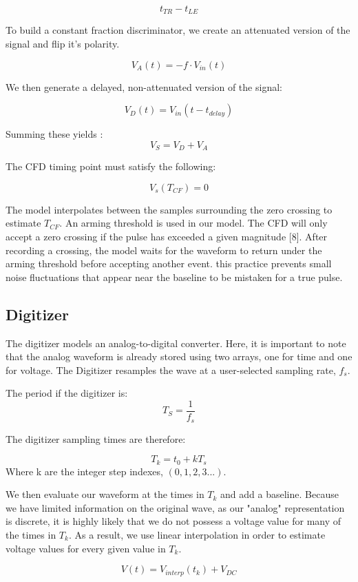 \documentclass[10pt]{article}
\begin{document}
$$
t_{TR}-t_{LE}
$$


To build a constant fraction discriminator, we create an attenuated version of the signal and flip it's polarity. 

$$
V_A(t) = - f \cdot V_{in}(t)
$$

We then generate a delayed, non-attenuated version of the signal: 

$$
V_D(t) = V_{in}(t -t_{delay})
$$

Summing these yields : 
$$
V_{S} = V_D  +V_A
$$

The CFD timing point must satisfy the following: 

$$
V_s(T_{CF}) = 0
$$

The model interpolates between the samples surrounding the zero crossing to estimate $T_{CF}$. An arming threshold is used in our model. The CFD will only accept a zero crossing if the pulse has exceeded a given magnitude [8]. After recording a crossing, the model waits for the waveform to return under the arming threshold before accepting another event. this practice prevents small noise fluctuations that appear near the baseline to be mistaken for a true pulse. 



\subsection{Digitizer}
The digitizer models an analog-to-digital converter. Here, it is important to note that the analog waveform is already stored using two arrays, one for time and one for voltage. The Digitizer resamples the wave at a user-selected sampling rate, $f_s$. 

The period if the digitizer is:
$$
T_S = \frac{1}{f_s}
$$

The digitizer sampling times are therefore: 

$$
T_k = t_0 + kT_s
$$
Where k are the integer step indexes, $(0,1,2,3 ...)$.


We then evaluate our waveform at the times in $T_k$ and add a baseline. Because we have limited information on the original wave, as our "analog" representation is discrete, it is highly likely that we do not possess a voltage value for many of the times in $T_k$. As a result, we use linear interpolation in order to estimate voltage values for every given value in $T_k$. 


$$
V(t) = V_{interp}(t_k) + V_{DC}
$$
\end{document}
